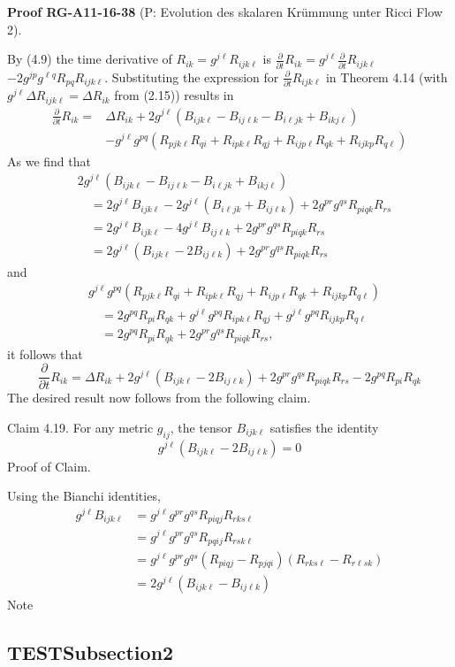 \documentclass[10pt, letterpaper]{article}
\newcommand{\CustomHeading}[3]{%
  \par\medskip\noindent%
  \textbf{#1 #2} \textnormal{(#3)}.\enskip%
}
\newenvironment{PROOF}[2]{\CustomHeading{Proof}{#1}{#2}}{}
\begin{document}
\begin{PROOF}{RG-A11-16-38}{P: Evolution des skalaren Krümmung unter Ricci Flow 2}
By (4.9) the time derivative of $R_{i k}=g^{j \ell} R_{i j k \ell}$ is $\frac{\partial}{\partial t} R_{i k}=g^{j \ell} \frac{\partial}{\partial t} R_{i j k \ell}$ $-2 g^{j p} g^{\ell q} R_{p q} R_{i j k \ell}$. Substituting the expression for $\frac{\partial}{\partial t} R_{i j k \ell}$ in Theorem 4.14 (with $g^{j \ell} \Delta R_{i j k \ell}=\Delta R_{i k}$ from (2.15)) results in
$$\begin{aligned}
\frac{\partial}{\partial t} R_{i k}= & \Delta R_{i k}+2 g^{j \ell}\left(B_{i j k \ell}-B_{i j \ell k}-B_{i \ell j k}+B_{i k j \ell}\right) \\
& -g^{j \ell} g^{p q}\left(R_{p j k \ell} R_{q i}+R_{i p k \ell} R_{q j}+R_{i j p \ell} R_{q k}+R_{i j k p} R_{q \ell}\right)
\end{aligned}$$
As we find that
$$\begin{aligned}
& 2 g^{j \ell}\left(B_{i j k \ell}-B_{i j \ell k}-B_{i \ell j k}+B_{i k j \ell}\right) \\
& \quad=2 g^{j \ell} B_{i j k \ell}-2 g^{j \ell}\left(B_{i \ell j k}+B_{i j \ell k}\right)+2 g^{p r} g^{q s} R_{p i q k} R_{r s} \\
& \quad=2 g^{j \ell} B_{i j k \ell}-4 g^{j \ell} B_{i j \ell k}+2 g^{p r} g^{q s} R_{p i q k} R_{r s} \\
& \quad=2 g^{j \ell}\left(B_{i j k \ell}-2 B_{i j \ell k}\right)+2 g^{p r} g^{q s} R_{p i q k} R_{r s}
\end{aligned}$$
and
$$\begin{aligned}
& g^{j \ell} g^{p q}\left(R_{p j k \ell} R_{q i}+R_{i p k \ell} R_{q j}+R_{i j p \ell} R_{q k}+R_{i j k p} R_{q \ell}\right) \\
& \quad=2 g^{p q} R_{p i} R_{q k}+g^{j \ell} g^{p q} R_{i p k \ell} R_{q j}+g^{j \ell} g^{p q} R_{i j k p} R_{q \ell} \\
& \quad=2 g^{p q} R_{p i} R_{q k}+2 g^{p r} g^{q s} R_{p i q k} R_{r s},
\end{aligned}$$
it follows that
$$\frac{\partial}{\partial t} R_{i k}=\Delta R_{i k}+2 g^{j \ell}\left(B_{i j k \ell}-2 B_{i j \ell k}\right)+2 g^{p r} g^{q s} R_{p i q k} R_{r s}-2 g^{p q} R_{p i} R_{q k}$$
The desired result now follows from the following claim.

Claim 4.19. For any metric $g_{i j}$, the tensor $B_{i j k \ell}$ satisfies the identity
$$g^{j \ell}\left(B_{i j k \ell}-2 B_{i j \ell k}\right)=0$$
Proof of Claim. 

Using the Bianchi identities,
$$\begin{aligned}
g^{j \ell} B_{i j k \ell} & =g^{j \ell} g^{p r} g^{q s} R_{p i q j} R_{r k s \ell} \\
& =g^{j \ell} g^{p r} g^{q s} R_{p q i j} R_{r s k \ell} \\
& =g^{j \ell} g^{p r} g^{q s}\left(R_{p i q j}-R_{p j q i}\right)\left(R_{r k s \ell}-R_{r \ell s k}\right) \\
& =2 g^{j \ell}\left(B_{i j k \ell}-B_{i j \ell k}\right)
\end{aligned}$$
Note
\end{PROOF}

\subsection{TESTSubsection2}
\end{document}
